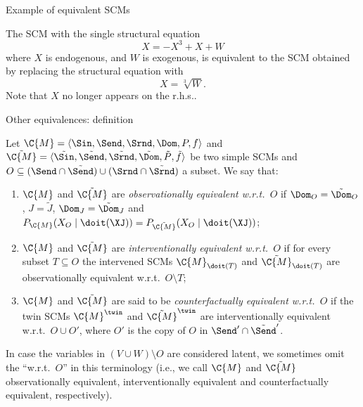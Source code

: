 \begin{frame}{Example of equivalent SCMs}
\begin{example}
  The SCM with the single structural equation
  $$X = -X^3 + X + W$$
  where $X$ is endogenous, and $W$ is exogenous, is equivalent to the SCM obtained by replacing the structural equation with
  $$X = \sqrt[3]{W}.$$
  Note that $X$ no longer appears on the r.h.s..
\end{example}
\end{frame}

\begin{frame}{Other equivalences: definition}
\begin{definition}
  Let $\C{M} = \langle \Sin, \Send, \Srnd, \Dom, P, f \rangle$ and
  $\tilde{\C{M}} = \langle \tilde{\Sin}, \tilde{\Send}, \tilde{\Srnd}, \tilde{\Dom}, \tilde{P}, \tilde{f} \rangle$ be two simple SCMs
  and $O \subseteq (\Send \cap \tilde{\Send}) \cup (\Srnd \cap \tilde{\Srnd})$ a subset.
  We say that:
  \begin{enumerate}
    \item $\C{M}$ and $\tilde{\C{M}}$ are \emph{observationally equivalent w.r.t.\ $O$} if $\Dom_O = \tilde{\Dom}_O$, $J = \tilde{J}$, $\Dom_J = \tilde{\Dom}_J$ and $P_{\C{M}}(X_O \mid \doit(\XJ)) = P_{\tilde{\C{M}}}(X_O \mid \doit(\XJ))$;
    \item $\C{M}$ and $\tilde{\C{M}}$ are \emph{interventionally equivalent w.r.t.\ $O$} if for every subset $T \subseteq O$ the intervened SCMs $\C{M}_{\doit(T)}$ and $\tilde{\C{M}}_{\doit(T)}$ are observationally equivalent w.r.t.\ $O \setminus T$;
    \item $\C{M}$ and $\tilde{\C{M}}$ are said to be \emph{counterfactually equivalent w.r.t.\ $O$} if the twin SCMs $\C{M}^\twin$ and $\tilde{\C{M}}^\twin$ are interventionally equivalent w.r.t.\ $O \cup O'$, where
  $O'$ is the copy of $O$ in $\Send' \cap \tilde{\Send}'$.
  \end{enumerate}
  In case the variables in $(V \cup W) \setminus O$ are considered latent, we sometimes omit the ``w.r.t.\ $O$'' in this terminology (i.e., we call $\C{M}$ and $\tilde{\C{M}}$ observationally equivalent, interventionally equivalent and counterfactually equivalent, respectively).
\end{definition}
\end{frame}

